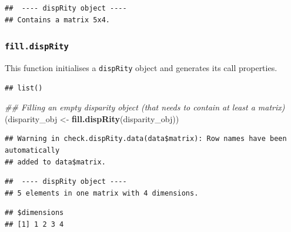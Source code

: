 \documentclass[]{book}
\newenvironment{Shaded}{\begin{snugshade}}{\end{snugshade}}
\newcommand{\CommentTok}[1]{\textcolor[rgb]{0.56,0.35,0.01}{\textit{#1}}}
\newcommand{\KeywordTok}[1]{\textcolor[rgb]{0.13,0.29,0.53}{\textbf{#1}}}
\newcommand{\NormalTok}[1]{#1}
\newcommand{\OperatorTok}[1]{\textcolor[rgb]{0.81,0.36,0.00}{\textbf{#1}}}
\newcommand{\StringTok}[1]{\textcolor[rgb]{0.31,0.60,0.02}{#1}}
\begin{document}
\begin{verbatim}
##  ---- dispRity object ---- 
## Contains a matrix 5x4.
\end{verbatim}

\hypertarget{fill.disprity}{%
\subsubsection{\texorpdfstring{\texttt{fill.dispRity}}{fill.dispRity}}\label{fill.disprity}}

This function initialises a \texttt{dispRity} object and generates its call properties.

\begin{Shaded}
\end{Shaded}

\begin{verbatim}
## list()
\end{verbatim}

\begin{Shaded}
\begin{Highlighting}[]
\CommentTok{## Filling an empty disparity object (that needs to contain at least a matrix)}
\NormalTok{(disparity_obj <-}\StringTok{ }\KeywordTok{fill.dispRity}\NormalTok{(disparity_obj))}
\end{Highlighting}
\end{Shaded}

\begin{verbatim}
## Warning in check.dispRity.data(data$matrix): Row names have been automatically
## added to data$matrix.
\end{verbatim}

\begin{verbatim}
##  ---- dispRity object ---- 
## 5 elements in one matrix with 4 dimensions.
\end{verbatim}

\begin{Shaded}
\end{Shaded}

\begin{verbatim}
## $dimensions
## [1] 1 2 3 4
\end{verbatim}
\end{document}

